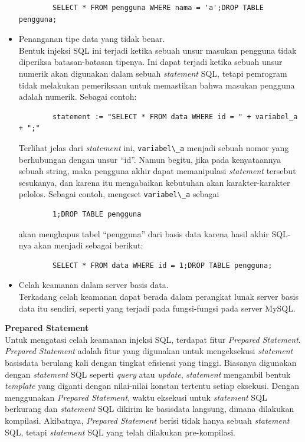 \begin{itemize}
	\begin{lstlisting}
		SELECT * FROM pengguna WHERE nama = 'a';DROP TABLE pengguna; 
	\end{lstlisting}
	\item Penanganan tipe data yang tidak benar.\\
	Bentuk injeksi SQL ini terjadi ketika sebuah unsur masukan pengguna tidak diperiksa batasan-batasan tipenya. Ini dapat terjadi ketika sebuah unsur numerik akan digunakan dalam sebuah \textit{statement} SQL, tetapi pemrogram tidak melakukan pemeriksaan untuk memastikan bahwa masukan pengguna adalah numerik. Sebagai contoh:
	
	\begin{lstlisting}
		statement := "SELECT * FROM data WHERE id = " + variabel_a + ";"
	\end{lstlisting}
	
	Terlihat jelas dari \textit{statement} ini, \verb!variabel\_a! menjadi sebuah nomor yang berhubungan dengan unsur ``id''. Namun begitu, jika pada kenyataannya sebuah string, maka pengguna akhir dapat memanipulasi \textit{statement} tersebut sesukanya, dan karena itu mengabaikan kebutuhan akan karakter-karakter pelolos. Sebagai contoh, mengeset \verb!variabel\_a! sebagai

	\begin{lstlisting}
		1;DROP TABLE pengguna
	\end{lstlisting}
	akan menghapus tabel ``pengguna'' dari basis data karena hasil akhir SQL-nya akan menjadi sebagai berikut:
	\begin{lstlisting}
		SELECT * FROM data WHERE id = 1;DROP TABLE pengguna;
	\end{lstlisting}
	
	\item Celah keamanan dalam server basis data.\\
	Terkadang celah keamanan dapat berada dalam perangkat lunak server basis data itu sendiri, seperti yang terjadi pada fungsi-fungsi pada server MySQL.
\end{itemize}

\textbf{Prepared Statement}\\
Untuk mengatasi celah keamanan injeksi SQL, terdapat fitur \textit{Prepared Statement}. \textit{Prepared Statement} adalah fitur yang digunakan untuk mengeksekusi \textit{statement} basisdata berulang kali dengan tingkat efisiensi yang tinggi.  Biasanya digunakan dengan \textit{statement} SQL seperti \textit{query} atau \textit{update}, \textit{statement} mengambil bentuk \textit{template} yang diganti dengan nilai-nilai konstan tertentu setiap eksekusi. Dengan menggunakan \textit{Prepared Statement}, waktu eksekusi untuk \textit{statement} SQL berkurang dan \textit{statement} SQL dikirim ke basisdata langsung, dimana dilakukan kompilasi. Akibatnya, \textit{Prepared Statement} berisi tidak hanya sebuah \textit{statement} SQL, tetapi \textit{statement} SQL yang telah dilakukan pre-kompilasi.

